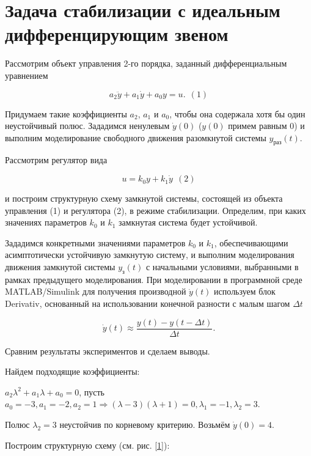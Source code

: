 
\section{Задача стабилизации с идеальным дифференцирующим звеном}


Рассмотрим объект управления 2-го порядка, заданный дифференциальным уравнением

\begin{par}
$$a_2 \ddot{y} +a_1 \dot{y} +a_0 y=u.~~(1)$$
\end{par}


Придумаем такие коэффициенты $a_2$, $a_1$ и $a_0$, чтобы она содержала хотя бы один неустойчивый полюс. Зададимся ненулевым $\dot{y} (0)$ ($y(0)$ примем равным 0) и выполним моделирование свободного движения разомкнутой системы $y_{\textrm{раз}} (t)$.


Рассмотрим регулятор вида 

\begin{par}
$$u=k_0 y+k_1 \dot{y} ~~(2)$$
\end{par}


и построим структурную схему замкнутой системы, состоящей из объекта управления (1) и регулятора (2), в режиме стабилизации. Определим, при каких значениях параметров $k_0$ и $k_1$ замкнутая система будет устойчивой.



Зададимся конкретными значениями параметров $k_0$ и $k_1$, обеспечивающими асимптотически устойчивую замкнутую систему, и выполним моделирования движения замкнутой системы $y_{\textrm{з}} (t)$ с начальными условиями, выбранными в рамках предыдущего моделирования. При моделировании в программной среде MATLAB/Simulink для получения производной $\dot{y} (t)$ используем блок Derivativ, основанный на использовании конечной разности с малым шагом $\Delta t$

$$\dot{y} (t)\approx \frac{y(t)-y(t-\Delta t)}{\Delta t}.$$



Сравним результаты экспериментов и сделаем выводы.




Найдем подходящие коэффициенты:


$a_2 \lambda^2 +a_1 \lambda +a_0 =0$, пусть $a_0 =-3,a_1 =-2,a_2 =1\Rightarrow (\lambda -3)(\lambda +1)=0,\lambda_1 =-1,\lambda_2 =3$.


Полюс $\lambda_2 =3$ неустойчив по корневому критерию. Возьмём $\dot{y} (0)=4$.


Построим структурную схему (см. рис. \ref{1}):

